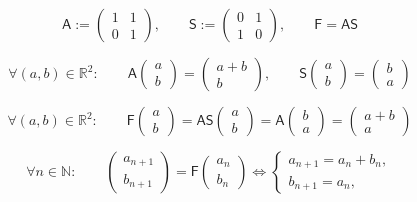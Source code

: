 \documentclass[12pt]{article}
\begin{document}
\begin{equation}
\mathsf{A}:=\begin{pmatrix}1&1\\[2pt]0&1\end{pmatrix},
\qquad
\mathsf{S}:=\begin{pmatrix}0&1\\[2pt]1&0\end{pmatrix},
\qquad
\mathsf{F}=\mathsf{A}\mathsf{S}
\end{equation}

\begin{equation}
\forall(a,b)\in\mathbb{R}^2:\qquad
\mathsf{A}\begin{pmatrix}a\\[2pt]b\end{pmatrix}
=
\begin{pmatrix}a+b\\[2pt]b\end{pmatrix},
\qquad
\mathsf{S}\begin{pmatrix}a\\[2pt]b\end{pmatrix}
=
\begin{pmatrix}b\\[2pt]a\end{pmatrix}
\end{equation}

\begin{equation}
\forall(a,b)\in\mathbb{R}^2:\qquad
\mathsf{F}\begin{pmatrix}a\\[2pt]b\end{pmatrix}
=
\mathsf{A}\mathsf{S}\begin{pmatrix}a\\[2pt]b\end{pmatrix}
=
\mathsf{A}\begin{pmatrix}b\\[2pt]a\end{pmatrix}
=
\begin{pmatrix}a+b\\[2pt]a\end{pmatrix}
\end{equation}

\begin{equation}
\forall n\in\mathbb{N}:\qquad
\begin{pmatrix}a_{n+1}\\[2pt]b_{n+1}\end{pmatrix}
=
\mathsf{F}\begin{pmatrix}a_n\\[2pt]b_n\end{pmatrix}
\Longleftrightarrow
\begin{cases}
a_{n+1}=a_n+b_n,\\[2pt]
b_{n+1}=a_n,
\end{cases}
\end{equation}
\end{document}
